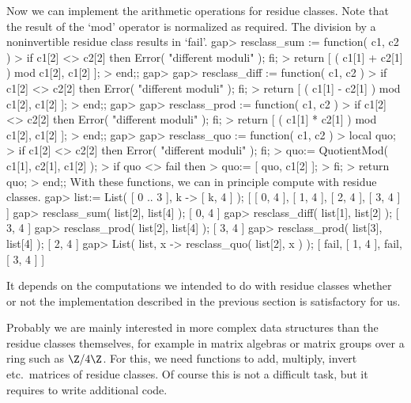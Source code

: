 Now we can implement the arithmetic operations for residue classes.
Note that the result of the `mod' operator is normalized as required.
The division by a noninvertible residue class results in `fail'.
\beginexample
gap> resclass_sum := function( c1, c2 )
>    if c1[2] <> c2[2] then Error( "different moduli" ); fi;
>    return [ ( c1[1] + c2[1] ) mod c1[2], c1[2] ];
> end;;
gap> 
gap> resclass_diff := function( c1, c2 )
>    if c1[2] <> c2[2] then Error( "different moduli" ); fi;
>    return [ ( c1[1] - c2[1] ) mod c1[2], c1[2] ];
> end;;
gap> 
gap> resclass_prod := function( c1, c2 )
>    if c1[2] <> c2[2] then Error( "different moduli" ); fi;
>    return [ ( c1[1] * c2[1] ) mod c1[2], c1[2] ];
> end;;
gap> 
gap> resclass_quo := function( c1, c2 )
>    local quo;
>    if c1[2] <> c2[2] then Error( "different moduli" ); fi;
>    quo:= QuotientMod( c1[1], c2[1], c1[2] );
>    if quo <> fail then
>      quo:= [ quo, c1[2] ];
>    fi;
>    return quo;
> end;;
\endexample
With these functions, we can in principle compute with residue classes.
\beginexample
gap> list:= List( [ 0 .. 3 ], k -> [ k, 4 ] );
[ [ 0, 4 ], [ 1, 4 ], [ 2, 4 ], [ 3, 4 ] ]
gap> resclass_sum( list[2], list[4] );
[ 0, 4 ]
gap> resclass_diff( list[1], list[2] );
[ 3, 4 ]
gap> resclass_prod( list[2], list[4] );
[ 3, 4 ]
gap> resclass_prod( list[3], list[4] );
[ 2, 4 ]
gap> List( list, x -> resclass_quo( list[2], x ) );
[ fail, [ 1, 4 ], fail, [ 3, 4 ] ]
\endexample



It depends on the computations we intended to do with residue classes
whether or not the implementation described in the previous section
is satisfactory for us.

Probably we are mainly interested in more complex data structures than
the residue classes themselves, for example in matrix algebras or matrix
groups over a ring such as $\Z/4\Z$.
For this, we need functions to add, multiply, invert etc.~matrices of
residue classes.
Of course this is not a difficult task, but it requires to write
additional {\GAP} code.

